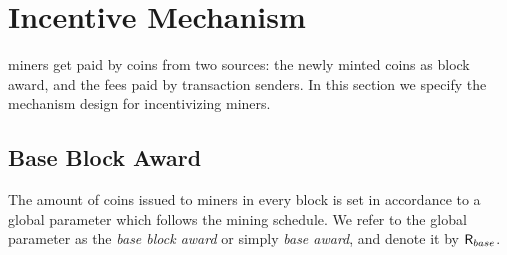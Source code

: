 
\section{Incentive Mechanism}
\label{sec:incentive}

\name miners get paid by \name coins from two sources: the newly minted \name coins as block award,
and the fees paid by transaction senders.
In this section we specify the mechanism design for incentivizing \name miners. 




\subsection{Base Block Award}
\label{subsec:baseaward}
The amount of coins issued to miners in every block is set in accordance to a global parameter which follows the mining schedule.
We refer to the global parameter as the \emph{base block award} or simply \emph{base award}, and denote it by $\textsf{R}_{base}$. 



